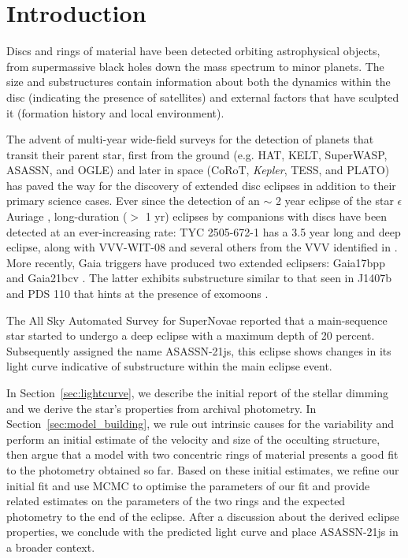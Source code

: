 \documentclass[letter]{aa} %
\begin{document}
\section{Introduction}\label{sec:intro}

Discs and rings of material have been detected orbiting astrophysical objects, from supermassive black holes down the mass spectrum to minor planets.
%
The size and substructures contain information about both the dynamics within the disc (indicating the presence of satellites) and external factors that have sculpted it (formation history and local environment).

The advent of multi-year wide-field surveys for the detection of planets that transit their parent star, first from the ground (e.g. HAT, KELT, SuperWASP, ASASSN, and OGLE) and later in space (CoRoT, \textit{Kepler}, TESS, and PLATO) has paved the way for the discovery of extended disc eclipses \citep[e.g. DESK; ]{Rodriguez15} in addition to their primary science cases.
%
Ever since the detection of an $\sim$ 2 year eclipse of the star $\epsilon$ Auriage \citep{Carroll91}, long-duration ($>$ 1 yr) eclipses by companions with discs have been detected at an ever-increasing rate: TYC 2505-672-1 \citep{Lipunov16,Rodriguez16} has a 3.5 year long and deep eclipse, along with VVV-WIT-08 \citep{Smith21} and several others from the VVV identified in \citet{Lucas24}.
%
More recently, Gaia triggers have produced two extended eclipsers: Gaia17bpp \citep{Tzanidakis23} and Gaia21bcv \citep{Hodapp24}. The latter exhibits substructure similar to that seen in J1407b \citep{Mamajek12} and PDS 110 \citep{Osborn17} that hints at the presence of exomoons \citep{Kenworthy_2015}.

The All Sky Automated Survey for SuperNovae \citep[ASAS-SN; ][]{Shappee14,Kochanek17} reported that a main-sequence star started to undergo a deep eclipse with a maximum depth of 20 percent. Subsequently assigned the name ASASSN-21js, this eclipse shows changes in its light curve indicative of substructure within the main eclipse event.

In Section~\ref{sec:lightcurve}, we describe the initial report of the stellar dimming and we derive the star's properties from archival photometry. In Section~\ref{sec:model_building}, we rule out intrinsic causes for the variability and perform an initial estimate of the velocity and size of the occulting structure, then argue that a model with two concentric rings of material presents a good fit to the photometry obtained so far. Based on these initial estimates, we refine our initial fit and use MCMC to optimise the parameters of our fit and provide related estimates on the parameters of the two rings and the expected photometry to the end of the eclipse. After a discussion about the derived eclipse properties, we conclude with the predicted light curve and place ASASSN-21js in a broader context.
\end{document}
